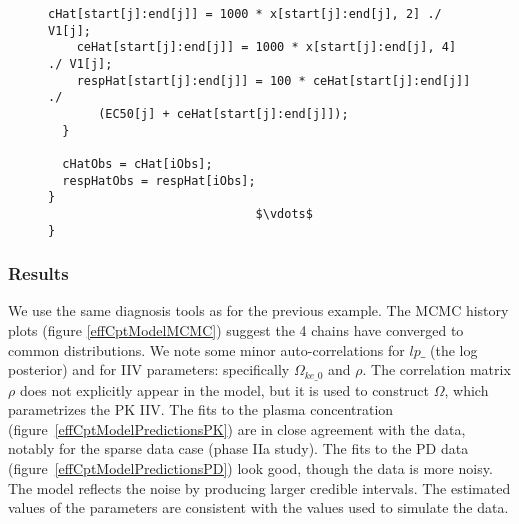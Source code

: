 \documentclass[11pt]{amsart}
\newenvironment{fmpage}[1]
     {\begin{lrbox}{\fmbox}\begin{minipage}{#1}}
     {\end{minipage}\end{lrbox}\fbox{\usebox{\fmbox}}}
\begin{document}
\begin{figure}
\begin{small}
\begin{center}
\begin{fmpage}{\textwidth - .75in}
\begin{lstlisting}[basicstyle=\tiny\ttfamily,mathescape=true,flexiblecolumns=true,frame=single,escapeinside=`']
    cHat[start[j]:end[j]] = 1000 * x[start[j]:end[j], 2] ./ V1[j];
    ceHat[start[j]:end[j]] = 1000 * x[start[j]:end[j], 4] ./ V1[j];
    respHat[start[j]:end[j]] = 100 * ceHat[start[j]:end[j]] ./ 
       (EC50[j] + ceHat[start[j]:end[j]]);
  }

  cHatObs = cHat[iObs];
  respHatObs = respHat[iObs];
}
                             $\vdots$  
} 
\end{lstlisting}
\end{fmpage}
\end{center}
\end{small}
\label{effCptModelCode}
\end{figure}

\subsubsection*{Results} We use the same diagnosis tools as for the previous example. The MCMC history plots (figure \ref{effCptModelMCMC}) suggest the 4 chains have converged to common distributions. We note some minor auto-correlations for $lp\_$ (the log posterior) and for IIV parameters: specifically $\Omega_{ke\_0}$ and $\rho$. The correlation matrix $\rho$ does not explicitly appear in the model, but it is used to construct $\Omega$, which parametrizes the PK IIV. The fits to the plasma concentration  (figure~\ref{effCptModelPredictionsPK}) are in close agreement with the data, notably for the sparse data case (phase IIa study). The fits to the PD data (figure~\ref{effCptModelPredictionsPD}) look good, though the data is more noisy. The model reflects the noise by producing larger credible intervals. The estimated values of the parameters are consistent with the values used to simulate the data.
\end{document}
